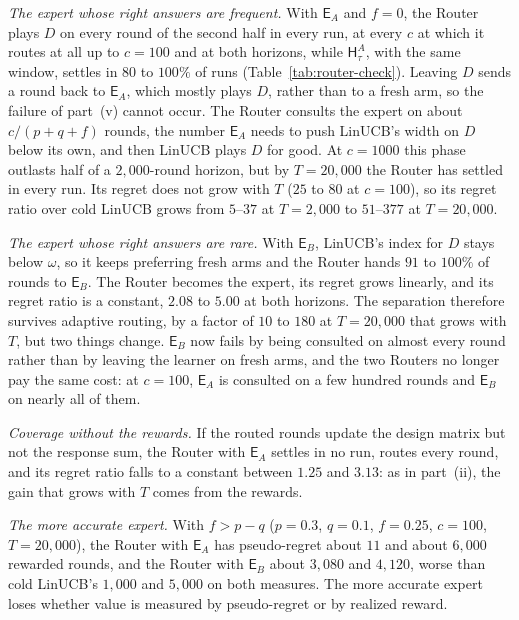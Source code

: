\documentclass[anon]{alt2027} %
\newcommand{\Exp}{\mathsf{E}}
\newcommand{\Hyb}{\mathsf{H}}
\begin{document}
\emph{The expert whose right answers are frequent.} With $\Exp_A$ and $f=0$, the
Router plays $D$ on every round of the second half in every run, at every $c$
at which it routes at all up to $c=100$ and at both horizons, while
$\Hyb^A_\tau$, with the same window, settles in $80$ to $100\%$ of runs (Table~\ref{tab:router-check}).
Leaving $D$ sends a round back to $\Exp_A$, which mostly plays $D$, rather
than to a fresh arm, so the failure of part~(v) cannot occur. The Router
consults the expert on about $c/(p+q+f)$ rounds, the number $\Exp_A$ needs to
push LinUCB's width on $D$ below its own, and then LinUCB plays $D$ for good.
At $c=1000$ this phase outlasts half of a $2{,}000$-round horizon, but by
$T=20{,}000$ the Router has settled in every run. Its regret does not grow with
$T$ ($25$ to $80$ at $c=100$), so its regret ratio over cold LinUCB grows from
$5$--$37$ at $T=2{,}000$ to $51$--$377$ at $T=20{,}000$.

\emph{The expert whose right answers are rare.} With $\Exp_B$, LinUCB's index for
$D$ stays below $\omega$, so it keeps preferring fresh arms and the Router hands
$91$ to $100\%$ of rounds to $\Exp_B$. The Router becomes the expert, its regret
grows linearly, and its regret ratio is a constant, $2.08$ to $5.00$ at both
horizons. The separation therefore survives adaptive routing, by a factor of
$10$ to $180$ at $T=20{,}000$ that grows with $T$, but two things change.
$\Exp_B$ now fails by being consulted on almost every round rather than by
leaving the learner on fresh arms, and the two Routers no longer pay the same
cost: at $c=100$, $\Exp_A$ is consulted on a few hundred rounds and $\Exp_B$ on
nearly all of them.

\emph{Coverage without the rewards.} If the routed rounds update the design
matrix but not the response sum, the Router with $\Exp_A$ settles in no run,
routes every round, and its regret ratio falls to a constant between $1.25$
and $3.13$: as in part~(ii), the gain that grows with $T$ comes from the
rewards.

\emph{The more accurate expert.} With $f>p-q$ ($p=0.3$, $q=0.1$, $f=0.25$, $c=100$,
$T=20{,}000$), the Router with $\Exp_A$ has pseudo-regret about $11$ and about
$6{,}000$ rewarded rounds, and the Router with $\Exp_B$ about $3{,}080$ and
$4{,}120$, worse than cold LinUCB's $1{,}000$ and $5{,}000$ on both measures. The
more accurate expert loses whether value is measured by pseudo-regret or by
realized reward.
\end{document}
